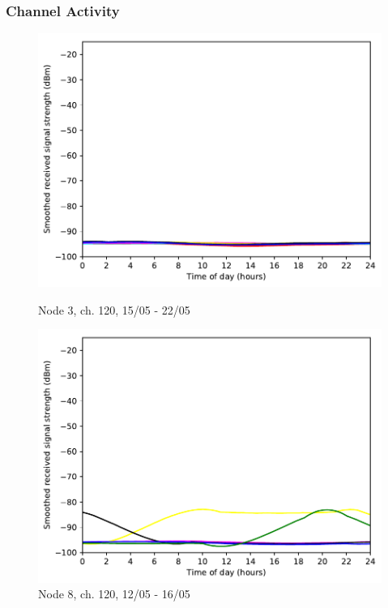 \documentclass[a4paper, 11pt]{article}
\begin{document}
\subsubsection{Channel Activity}
\begin{figure}[ht]
\begin{minipage}{0.47\textwidth}
	\centering
	\includegraphics[width=\textwidth]{images/5_GHz/cot-node3-student_2017-05-22_chan100_image.pdf}
	\caption{Node 3, ch. 120, 15/05 - 22/05}
	\label{node3_5ghz_traffic_chan100}
\end{minipage}\hfill
\begin{minipage}{0.47\textwidth}
	\centering
	\includegraphics[width=\textwidth]{images/5_GHz/cot-node8-student_2017-05-16_chan120_image.pdf}
	\caption{Node 8, ch. 120, 12/05 - 16/05}
	\label{node8_5ghz_traffic_chan120}
\end{minipage}\hfill
\end{figure}
\end{document}
